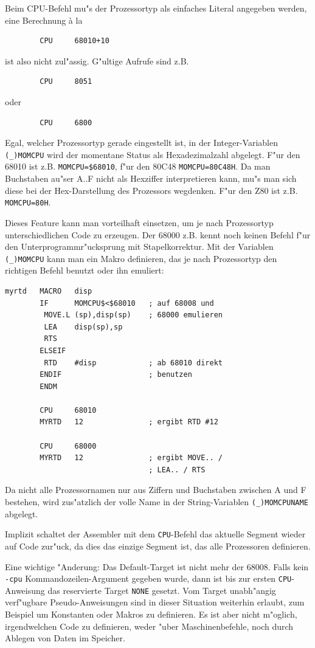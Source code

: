 \documentclass[12pt,a4paper,twoside]{report}
\newcommand{\tty}[1]{{\tt #1}}
\newcommand{\predefsym}[1]{{\tt (\_)#1}}
\begin{document}
Beim CPU-Befehl mu"s der Prozessortyp als einfaches Literal
angegeben werden, eine Berechnung \`a la
\begin{verbatim}
        CPU     68010+10
\end{verbatim}
ist also nicht zul"assig.  G"ultige Aufrufe sind z.B.
\begin{verbatim}
        CPU     8051
\end{verbatim}
oder
\begin{verbatim}
        CPU     6800
\end{verbatim}
Egal, welcher Prozessortyp gerade eingestellt ist, in der
Integer-Variablen \predefsym{MOMCPU} wird der momentane Status als Hexadezimalzahl
abgelegt.  F"ur den 68010 ist z.B. \tty{MOMCPU=\$68010}, f"ur den 80C48
\tty{MOMCPU=80C48H}.  Da man Buchstaben au"ser A..F nicht als Hexziffer
interpretieren kann, mu"s man sich diese bei der Hex-Darstellung
des Prozessors wegdenken. F"ur den Z80 ist z.B. \tty{MOMCPU=80H}.
\par
Dieses Feature kann
man vorteilhaft einsetzen, um je nach Prozessortyp unterschiedlichen
Code zu erzeugen.  Der 68000 z.B. kennt noch keinen Befehl f"ur den
Unterprogrammr"ucksprung mit Stapelkorrektur.  Mit der Variablen
\predefsym{MOMCPU} kann man ein Makro definieren, das je nach Prozessortyp den
richtigen Befehl benutzt oder ihn emuliert:
\begin{verbatim}
myrtd   MACRO   disp
        IF      MOMCPU$<$68010   ; auf 68008 und
         MOVE.L (sp),disp(sp)    ; 68000 emulieren
         LEA    disp(sp),sp
         RTS
        ELSEIF
         RTD    #disp            ; ab 68010 direkt
        ENDIF                    ; benutzen
        ENDM

        CPU     68010
        MYRTD   12               ; ergibt RTD #12

        CPU     68000
        MYRTD   12               ; ergibt MOVE.. /
                                 ; LEA.. / RTS
\end{verbatim}
Da nicht alle Prozessornamen nur aus Ziffern und Buchstaben zwischen
A und F bestehen, wird zus"atzlich der volle Name in der
String-Variablen \predefsym{MOMCPUNAME} abgelegt.
\par
Implizit schaltet der Assembler mit dem \tty{CPU}-Befehl das aktuelle Segment
wieder auf Code zur"uck, da dies das einzige Segment ist, das alle
Prozessoren definieren.
\par
Eine wichtige "Anderung: Das Default-Target ist nicht mehr der 68008.  Falls
kein {\tt -cpu} Kommandozeilen-Argument gegeben wurde, dann ist bis zur
ersten \tty{CPU}-Anweisung das reservierte Target \tty{NONE} gesetzt.  Vom
Target unabh"angig verf"ugbare Pseudo-Anweisungen sind in dieser Situation
weiterhin erlaubt, zum Beispiel um Konstanten oder Makros zu definieren.
Es ist aber nicht m"oglich, irgendwelchen Code zu definieren, weder "uber
Maschinenbefehle, noch durch Ablegen von Daten im Speicher.
\end{document}
